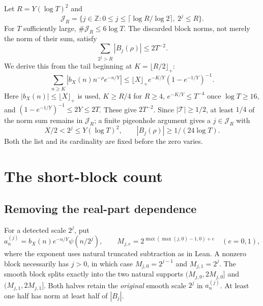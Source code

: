 \documentclass[11pt,a4paper]{article}
\numberwithin{equation}{section}
\theoremstyle{definition}
\newcommand{\Z}{\mathbb Z}
\begin{document}
Let $R=Y(\log T)^2$ and
\[
 \mathcal J_R=\{j\in\Z:0\le j\le\lceil\log R/\log2\rceil,\ 2^j\le R\}.
\]
For $T$ sufficiently large, $\#\mathcal J_R\le6\log T$.
The discarded block norms, not merely the norm of their sum, satisfy
\[
 \sum_{2^j>R}|B_j(\rho)|\le2T^{-2}.
\]
We derive this from the tail beginning at
$K=\lfloor R/2\rfloor_+$:
\[
 \sum_{n\ge K}|b_X(n)n^{-\rho}e^{-n/Y}|
 \le\lfloor X\rfloor_+e^{-K/Y}(1-e^{-1/Y})^{-1}.
\]
Here $|b_X(n)|\le\lfloor X\rfloor_+$ is used, $K\ge R/4$ for $R\ge4$,
$e^{-K/Y}\le T^{-4}$ once $\log T\ge16$, and
$(1-e^{-1/Y})^{-1}\le2Y\le2T$. These give $2T^{-2}$.
Since $|\mathcal T|\ge1/2$, at least $1/4$ of the norm sum remains in
$\mathcal J_R$; a finite pigeonhole argument gives a $j\in \mathcal J_R$ with
\begin{equation}\label{eq:blockdetect}
 X/2<2^j\le Y(\log T)^2,\qquad |B_j(\rho)|\ge1/(24\log T).
\end{equation}
Both the list and its cardinality are fixed before the zero varies.


\section{The short-block count}
\label{sec:short}
\subsection{Removing the real-part dependence}
For a detected scale $2^j$, put
\[
 a_n^{(j)}=b_X(n)e^{-n/Y}\psi(n/2^j),\qquad
 M_{j,e}=2^{\max(\max(j,0)-1,0)+e}\quad(e=0,1),
\]
where the exponent uses natural truncated subtraction as in Lean. A nonzero
block necessarily has $j>0$, in which case $M_{j,0}=2^{j-1}$ and
$M_{j,1}=2^j$.
The smooth block splits exactly into the two natural supports
$(M_{j,0},2M_{j,0}]$ and $(M_{j,1},2M_{j,1}]$.
Both halves retain the \emph{original} smooth scale $2^j$ in $a_n^{(j)}$.
At least one half has norm at least half of $|B_j|$.
\end{document}

